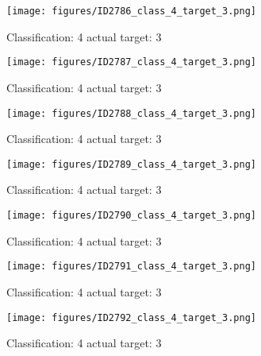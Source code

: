 \begin{figure}[h!]
\begin{center}
\texttt{[image: figures/ID2786\_class\_4\_target\_3.png]}
\end{center}
\caption{ Classification: 4 actual target: 3}
\label{fig:ID2786_class_4_target_3}
\end{figure}
\begin{figure}[h!]
\begin{center}
\texttt{[image: figures/ID2787\_class\_4\_target\_3.png]}
\end{center}
\caption{ Classification: 4 actual target: 3}
\label{fig:ID2787_class_4_target_3}
\end{figure}
\begin{figure}[h!]
\begin{center}
\texttt{[image: figures/ID2788\_class\_4\_target\_3.png]}
\end{center}
\caption{ Classification: 4 actual target: 3}
\label{fig:ID2788_class_4_target_3}
\end{figure}
\begin{figure}[h!]
\begin{center}
\texttt{[image: figures/ID2789\_class\_4\_target\_3.png]}
\end{center}
\caption{ Classification: 4 actual target: 3}
\label{fig:ID2789_class_4_target_3}
\end{figure}
\begin{figure}[h!]
\begin{center}
\texttt{[image: figures/ID2790\_class\_4\_target\_3.png]}
\end{center}
\caption{ Classification: 4 actual target: 3}
\label{fig:ID2790_class_4_target_3}
\end{figure}
\begin{figure}[h!]
\begin{center}
\texttt{[image: figures/ID2791\_class\_4\_target\_3.png]}
\end{center}
\caption{ Classification: 4 actual target: 3}
\label{fig:ID2791_class_4_target_3}
\end{figure}
\begin{figure}[h!]
\begin{center}
\texttt{[image: figures/ID2792\_class\_4\_target\_3.png]}
\end{center}
\caption{ Classification: 4 actual target: 3}
\label{fig:ID2792_class_4_target_3}
\end{figure}
